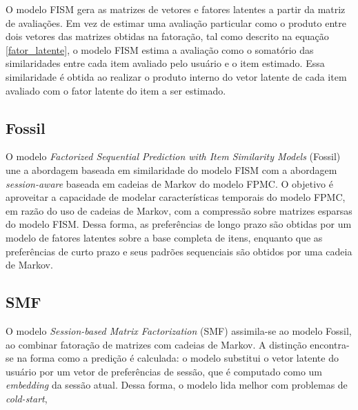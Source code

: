 O modelo FISM gera as matrizes de vetores e fatores latentes a partir da matriz
de avaliações. Em vez de estimar uma avaliação particular como o produto entre
dois vetores das matrizes obtidas na fatoração, tal como descrito na equação
\ref{fator_latente}, o modelo FISM estima a avaliação como o somatório das
similaridades entre cada item avaliado pelo usuário e o item estimado. Essa
similaridade é obtida ao realizar o produto interno do vetor latente de cada
item avaliado com o fator latente do item a ser estimado.

\subsection{Fossil}
O modelo \textit{Factorized Sequential Prediction with Item Similarity Models}
(Fossil) \cite{fossil} une a abordagem baseada em similaridade do modelo FISM com a abordagem
\textit{session-aware} baseada em cadeias de Markov do modelo FPMC. O objetivo é
aproveitar a capacidade de modelar características temporais do modelo FPMC, em
razão do uso de cadeias de Markov, com a compressão sobre matrizes esparsas do
modelo FISM. Dessa forma, as preferências de longo prazo são obtidas por um
modelo de fatores latentes sobre a base completa de itens, enquanto que as
preferências de curto prazo e seus padrões sequenciais são obtidos por uma
cadeia de Markov.

\subsection{SMF}
 O modelo
\textit{Session-based Matrix Factorization} (SMF) \cite{ludewig_2018}
assimila-se ao modelo Fossil, ao combinar fatoração de matrizes com cadeias de
Markov. A distinção encontra-se na forma como a predição é calculada: o modelo
substitui o vetor latente do usuário por um vetor de preferências de sessão, que
é computado como um \textit{embedding} da sessão atual. Dessa forma, o modelo
lida melhor com problemas de \textit{cold-start}, 


